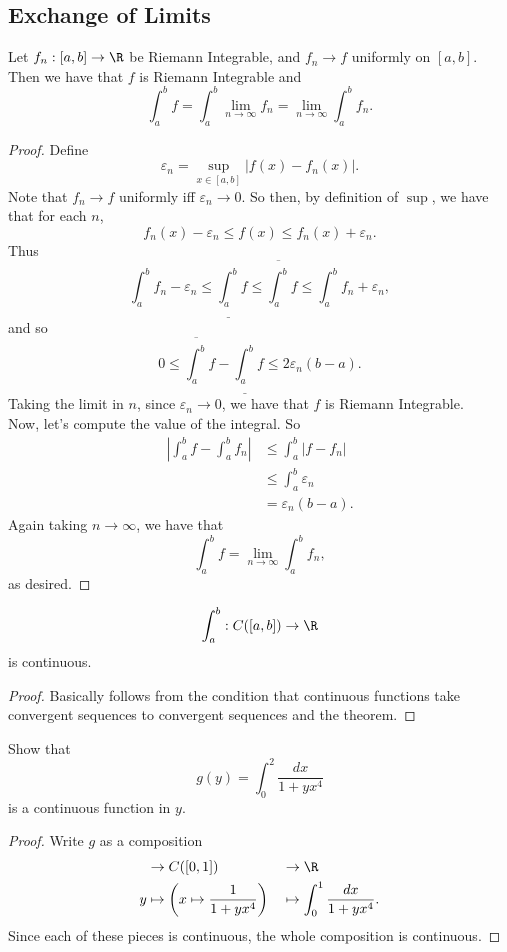 \documentclass{notes}
\begin{document}
\subsection{Exchange of Limits}
\begin{theorem}
  Let $f_n: [a,b] \to \R$ be Riemann Integrable, and $f_n \to f$ uniformly on $[a,b]$. Then we have
  that $f$ is Riemann Integrable and 
  $$\int_a^b f = \int_a^b \lim_{n\to\infty} f_n = \lim_{n\to\infty} \int_a^b f_n.$$ 
\end{theorem}
\begin{proof}
  Define $$\varepsilon_n = \sup_{x\in[a,b]} |f(x) - f_n(x)|.$$ Note that $f_n \to f$ uniformly iff 
  $\varepsilon_n \to 0$. So then, by definition of $\sup$, we have that for each $n$, 
  $$f_n(x) - \varepsilon_n \leq f(x) \leq f_n(x) + \varepsilon_n.$$
  Thus
  $$\int_a^b f_n - \varepsilon_n \leq \underline{\int_a^b} f \leq \overline{\int_a^b} f \leq
  \int_a^b f_n + \varepsilon_n,$$
  and so 
  $$0 \leq \overline{\int_a^b}f - \underline{\int_a^b}f \leq 2\varepsilon_n (b-a).$$
  Taking the limit in $n$, since $\varepsilon_n\to 0$, we have that $f$ is Riemann Integrable. \\

  Now, let's compute the value of the integral. So
  \begin{align*}
    \left| \int_a^b f - \int_a^b f_n \right|  &\leq \int_a^b |f - f_n| \\
                                              &\leq \int_a^b \varepsilon_n \\
                                              &= \varepsilon_n (b-a).
  \end{align*}
  Again taking $n\to\infty$, we have that 
  $$\int_a^b f = \lim_{n\to\infty} \int_a^b f_n,$$ as desired.
\end{proof}
\begin{corollary}
  $$\int_a^b: C([a,b]) \to \R$$ is continuous.
\end{corollary}
\begin{proof}
  Basically follows from the condition that continuous functions take convergent sequences to
  convergent sequences and the theorem.
\end{proof}
\begin{example}
  Show that $$g(y) = \int_0^2 \frac{dx}{1 + yx^4}$$ is a continuous function in $y$.
\end{example}
\begin{proof}
  Write $g$ as a composition
  \begin{align*}
    [0,2] &\to C([0,1]) &&\to \R \\
    y &\mapsto \left(x \mapsto \frac{1}{1+yx^4}\right) &&\mapsto \int_0^1 \frac{dx}{1 + yx^4}.
  \end{align*}
  Since each of these pieces is continuous, the whole composition is continuous.
\end{proof}
\end{document}
